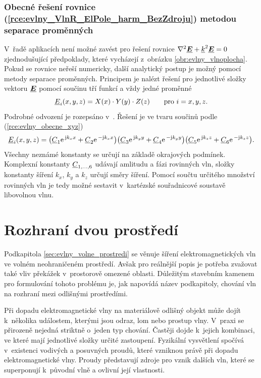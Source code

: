 \subsubsection*{Obecné řešení rovnice (\ref{rce:evlny_VlnR_ElPole_harm_BezZdroju}) metodou separace proměnných}
V~řadě aplikacích není možné zavést pro řešení rovnice $\nabla^{2}\mbox{\underline{\boldmath$E$}} +{\underline{k}}^{2}\mbox{\underline{\boldmath$E$}} = 0$  zjednodušující předpoklady, které vycházejí z~obrázku \ref{obr:evlny_vlnoplocha}. Pokud se rovnice neřeší numericky, další analytický postup je možný pomocí metody separace proměnných. Principem je nalézt řešení pro jednotlivé složky vektoru $\mbox{\underline{\boldmath$E$}}$ pomocí součinu tří funkcí a vždy jedné proměnné
\begin{equation}
	{\underline{E}}_{i}(x,y,z) = X(x)\cdot Y(y)\cdot Z(z)\qquad\mathrm{pro}\ i = x, y, z.
	\label{rce:evlny_obecne_xyz}
\end{equation}
Podrobné odvození je rozepsáno v~\cite[str. 50]{emp}. Řešení je ve tvaru součinů podle (\ref{rce:evlny_obecne_xyz})
\begin{equation}
	{\underline{E}}_{i}(x,y,z) = \big( {\underline{C}}_{1}\mathrm{e\,}^{\mathrm{j} k_{x}x} +{\underline{C}}_{2}\mathrm{e\,}^{-\mathrm{j} k_{x}x} \big)\big({\underline{C}}_{3}\mathrm{e\,}^{\mathrm{j} k_{y}y} + {\underline{C}}_{4}\mathrm{e\,}^{-\mathrm{j} k_{y}y} \big)\big({\underline{C}}_{5}\mathrm{e\,}^{\mathrm{j} k_{z}z} + {\underline{C}}_{6}\mathrm{e\,}^{-\mathrm{j} k_{z}z} \big).
	\label{rce:evlny_obecne_reseni}
\end{equation}
Všechny neznámé konstanty se určují na základě okrajových podmínek. Komplexní konstanty ${\underline{C}}_{1,\ldots,6}$ udávají amlitudu a fázi rovinných vln, složky konstanty šíření $k_{x}$, $k_{y}$ a $k_{z}$ určují směry šíření. Pomocí součtu určitého množství rovinných vln je tedy možné sestavit v~kartézské souřadnicové soustavě libovolnou vlnu.

\section{Rozhraní dvou prostředí} \label{sec:evlny_rozhrani_dvou_prostredi}
Podkapitola \ref{sec:evlny_volne_prostredi} se věnuje šíření elektromagnetických vln ve volném neohraničeném prostředí. Avšak pro reálnější popis je potřeba zvažovat také vliv překážek v~prostorově omezené oblasti. Důležitým stavebním kamenem pro formulování tohoto problému je, jak napovídá název podkapitoly, chování vln na rozhraní mezi odlišnými prostředími.

Při dopadu elektromagnetické vlny na materiálově odlišný objekt může dojít k~několika událostem, kterými jsou odraz, lom nebo prostup vlny. V~praxi se přirozeně nejedná striktně o~jeden typ chování. Častěji dojde k~jejich kombinaci, ve které mají jednotlivé složky určité zastoupení. Fyzikální vysvětlení spočívá v~existenci vodivých a posuvných proudů, které vzniknou právě při dopadu elektromagnetické vlny. Proudy představují zdroje pro vznik dalších vln, které se superponují k~původní vlně a ovlivní její vlastnosti. 

